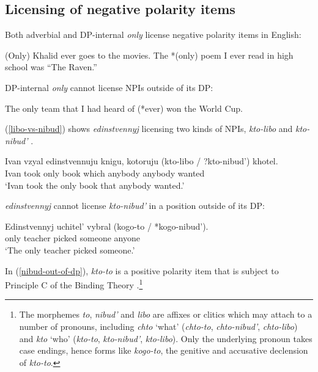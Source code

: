 \documentclass{article}
\begin{document}
\subsection{Licensing of negative polarity items}
Both adverbial and DP-internal \textit{only} license negative polarity items in English:

\begin{exe}
	\ex *(Only) Khalid ever goes to the movies.
	\ex The *(only) poem I ever read in high school was ``The Raven.''
\end{exe}

DP-internal \textit{only} cannot license NPIs outside of its DP:

\begin{exe}
	\ex The only team that I had heard of (*ever) won the World Cup.
\end{exe}

(\ref{libo-vs-nibud}) shows \textit{edinstvennyj} licensing two kinds of NPIs, \textit{kto-libo} \citep{pereltsvaig06} and \textit{kto-nibud'} \citep{russneg}.

\begin{exe}
	\ex \label{libo-vs-nibud} \gll Ivan vzyal edinstvennuju knigu, kotoruju (kto-libo / ?kto-nibud') khotel.\\
	Ivan took only book which anybody {} anybody wanted\\
	\glt `Ivan took the only book that anybody wanted.'
\end{exe}

\textit{edinstvennyj} cannot license \textit{kto-nibud'} in a position outside of its DP:

\begin{exe}
	\ex \label{nibud-out-of-dp} \gll Edinstvennyj uchitel' vybral (kogo-to / *kogo-nibud').\\
	only teacher picked someone {} anyone\\
	\glt `The only teacher picked someone.'
\end{exe}

In (\ref{nibud-out-of-dp}), \textit{kto-to}	is a positive polarity item that is subject to Principle C of the Binding Theory \citep{russneg}.\footnote{The morphemes \textit{to}, \textit{nibud'} and \textit{libo} are affixes or clitics which may attach to a number of pronouns, including \textit{chto} `what' (\textit{chto-to}, \textit{chto-nibud'}, \textit{chto-libo}) and \textit{kto} `who' (\textit{kto-to}, \textit{kto-nibud'}, \textit{kto-libo}). Only the underlying pronoun takes case endings, hence forms like \textit{kogo-to}, the genitive and accusative declension of \textit{kto-to}.}
\end{document}
